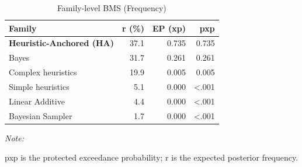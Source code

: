 \begin{table}[!h]
\centering
\caption{Family-level BMS (Frequency)}
\centering
\begin{threeparttable}
\begin{tabular}[t]{lrrr}
\toprule
Family & r (\%) & EP (xp) & pxp\\
\midrule
\textbf{Heuristic-Anchored (HA)} & 37.1 & 0.735 & 0.735\\
Bayes & 31.7 & 0.261 & 0.261\\
Complex heuristics & 19.9 & 0.005 & 0.005\\
Simple heuristics & 5.1 & 0.000 & <.001\\
Linear Additive & 4.4 & 0.000 & <.001\\
Bayesian Sampler & 1.7 & 0.000 & <.001\\
\bottomrule
\end{tabular}
\begin{tablenotes}
\item \textit{Note: } 
\item pxp is the protected exceedance probability; r is the expected posterior frequency.
\end{tablenotes}
\end{threeparttable}
\end{table}

